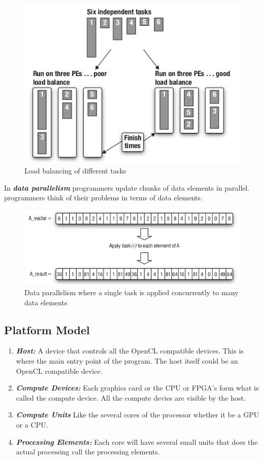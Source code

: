 \documentclass[10pt]{article}
\begin{document}
\begin{figure}[H]
  \centering
  \includegraphics[scale=0.5]{./images/load_balancing.png}
  \caption{Load balancing of different tasks}
  \label{load balancing}
\end{figure}

In \textit{\textbf{data parallelism}} programmers update chunks of data elements in parallel. programmers think of their problems in terms of data elements.

\begin{figure}[H]
  \centering
  \includegraphics[scale=0.7]{./images/data_parallelism.png}
  \caption{Data parallelism where a single task is applied concurrently to many data elements}
  \label{data parallelism}
\end{figure}

\subsection{Platform Model}
\begin{enumerate}
	\item \textbf{\textit{Host:}} A device that controls all the OpenCL compatible devices. This is where the main entry point of the program. The host itself could be an OpenCL compatible device.
	\item \textbf{\textit{Compute Devices:}} Each graphics card or the CPU or FPGA's form what is called the compute device. All the compute devies are visible by the host.
	\item \textbf{\textit{Compute Units}} Like the several cores of the processor whether it be a GPU or a CPU. 
	\item \textbf{\textit{Processing Elements:}} Each core will have several small units that does the actual processing call the processing elements.
\end{enumerate}
\end{document}
